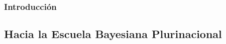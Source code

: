 \documentclass[a4paper,11pt]{book}
\theoremstyle{definition}
\begin{document}
\subsubsection{Introducción}

\begin{figure}[H]
\centering
  \begin{subfigure}[b]{1\textwidth}
  \end{subfigure}
\end{figure}


\begin{figure}[H]
\centering
  \begin{subfigure}[b]{1\textwidth}
  \end{subfigure}
\end{figure}


\begin{figure}[H]
\centering
  \begin{subfigure}[b]{1\textwidth}
  \end{subfigure}
\end{figure}


\begin{figure}[H]
\centering
  \begin{subfigure}[b]{1\textwidth}
  \end{subfigure}
\end{figure}


\begin{figure}[H]
\centering
  \begin{subfigure}[b]{1\textwidth}
  \end{subfigure}
\end{figure}



\begin{figure}[H]
\centering
  \begin{subfigure}[b]{1\textwidth}
  \end{subfigure}
\end{figure}





\subsection{Hacia la Escuela Bayesiana Plurinacional}
\end{document}
